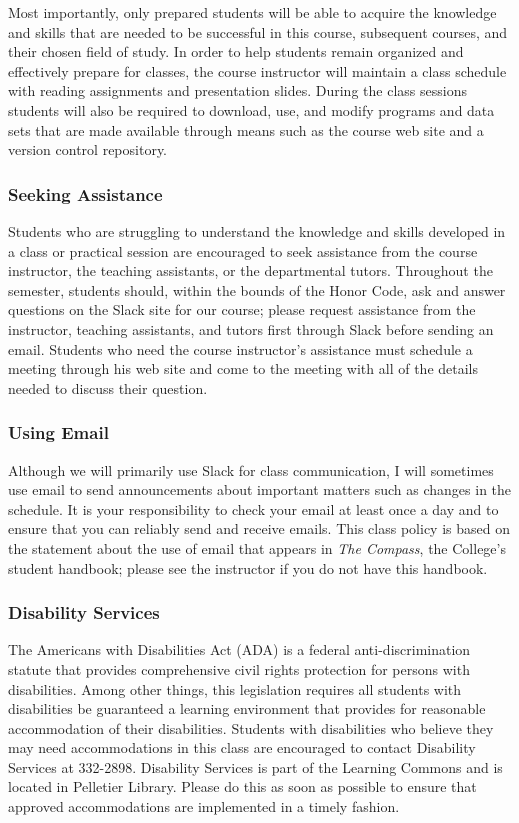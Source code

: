 Most importantly, only prepared students will be able to acquire the knowledge and skills that are needed to be
successful in this course, subsequent courses, and their chosen field of study. In order to help students remain
organized and effectively prepare for classes, the course instructor will maintain a class schedule with reading
assignments and presentation slides. During the class sessions students will also be required to download, use, and
modify programs and data sets that are made available through means such as the course web site and a version control
repository.

\subsubsection*{Seeking Assistance}

Students who are struggling to understand the knowledge and skills developed in a class or practical session are
encouraged to seek assistance from the course instructor, the teaching assistants, or the departmental tutors.
Throughout the semester, students should, within the bounds of the Honor Code, ask and answer questions on the Slack
site for our course; please request assistance from the instructor, teaching assistants, and tutors first through Slack
before sending an email. Students who need the course instructor's assistance must schedule a meeting through his web
site and come to the meeting with all of the details needed to discuss their question.

\subsubsection*{Using Email}

Although we will primarily use Slack for class communication, I will sometimes use email to send announcements about
important matters such as changes in the schedule. It is your responsibility to check your email at least once a day and
to ensure that you can reliably send and receive emails. This class policy is based on the statement about the use of
email that appears in {\em The Compass\/}, the College's student handbook; please see the instructor if you do not have
this handbook.

\subsubsection*{Disability Services}

The Americans with Disabilities Act (ADA) is a federal anti-discrimination statute that provides comprehensive civil
rights protection for persons with disabilities. Among other things, this legislation requires all students with
disabilities be guaranteed a learning environment that provides for reasonable accommodation of their disabilities.
Students with disabilities who believe they may need accommodations in this class are encouraged to contact Disability
Services at 332-2898. Disability Services is part of the Learning Commons and is located in Pelletier Library.
Please do this as soon as possible to ensure that approved accommodations are implemented in a timely fashion.

